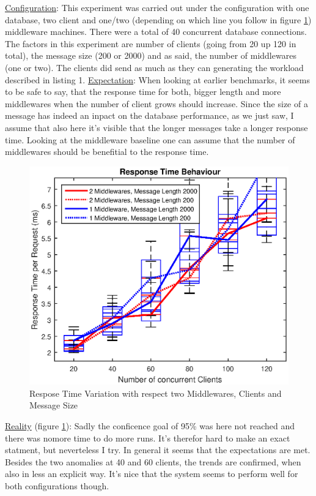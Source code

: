 \documentclass[11pt]{article}
\begin{document}
\underline{Configuration}: This experiment was carried out under the configuration with one database, two client and one/two (depending on which line you follow in figure \ref{fig:rt_experiment}) middleware machines. There were a total of 40 concurrent database connections. The factors in this experiment are number of clients (going from 20 up 120 in total), the message size (200 or 2000) and as said, the number of middlewares (one or two). The clients did send as much as they can generating the workload described in listing 1.
\newline\underline{Expectation}: When looking at earlier benchmarks, it seems to be safe to say, that the response time for both, bigger length and more middlewares when the number of client grows should increase. Since the size of a message has indeed an inpact on the database performance, as we just saw, I assume that also here it's visible that the longer messages take a longer response time. Looking at the middleware baseline one can assume that the number of middlewares should be benefitial to the response time.
\begin{figure}[!htb]
\centering
\includegraphics[width=0.7\linewidth]{figures/rt_experiment}
\caption{Respose Time Variation with respect two Middlewares, Clients and Message Size}
\label{fig:rt_experiment}
\end{figure}
\newline\underline{Reality} (figure \ref{fig:rt_experiment}): Sadly the conficence goal of 95\% was here not reached and there was nomore time to do more runs. It's therefor hard to make an exact statment, but neverteless I try. In general it seems that the expectations are met. Besides the two anomalies at 40 and 60 clients, the trends are confirmed, when also in less an explicit way. It's nice that the system seems to perform well for both configurations though.
\end{document}
